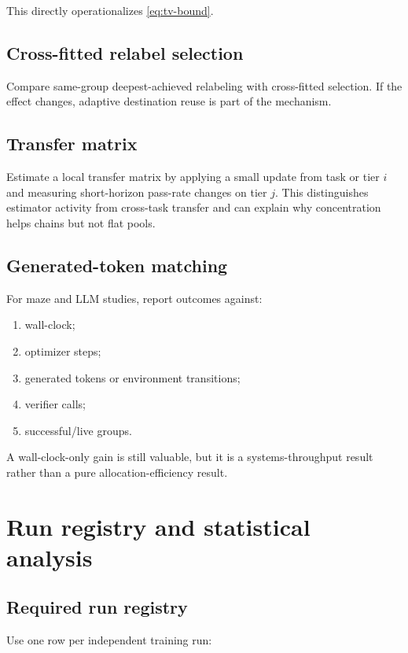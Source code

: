 \documentclass[11pt]{article}
\theoremstyle{definition}
\theoremstyle{remark}
\begin{document}
This directly operationalizes \cref{eq:tv-bound}.

\subsection{Cross-fitted relabel selection}

Compare same-group deepest-achieved relabeling with cross-fitted selection. If the effect changes, adaptive destination reuse is part of the mechanism.

\subsection{Transfer matrix}

Estimate a local transfer matrix by applying a small update from task or tier $i$ and measuring short-horizon pass-rate changes on tier $j$. This distinguishes estimator activity from cross-task transfer and can explain why concentration helps chains but not flat pools.

\subsection{Generated-token matching}

For maze and LLM studies, report outcomes against:

\begin{enumerate}[leftmargin=2em]
\item wall-clock;
\item optimizer steps;
\item generated tokens or environment transitions;
\item verifier calls;
\item successful/live groups.
\end{enumerate}

A wall-clock-only gain is still valuable, but it is a systems-throughput result rather than a pure allocation-efficiency result.

\section{Run registry and statistical analysis}

\subsection{Required run registry}

Use one row per independent training run:
\end{document}
